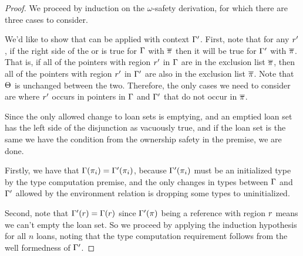 \begin{proof}
  We proceed by induction on the $\omega$-safety derivation, for which there are
  three cases to consider.

  \vspace{1em}
  \noindent \framebox[\textwidth]{ \figuresize
    \begin{mathpar}
      \OSafePlace
    \end{mathpar}
  } \vspace{1em}

  We'd like to show that  can be applied with context
  $\Gamma^\prime$. First, note that for any $r^\prime$, if the right
  side of the or is true for $\Gamma$ with $\overline{\pi}$ then it will
  be true for $\Gamma^\prime$ with $\overline{\pi}$. That is, if all of
  the pointers with region $r^\prime$ in $\Gamma$ are in the exclusion
  list $\overline{\pi}$, then all of the pointers with region
  $r^\prime$ in $\Gamma^\prime$ are also in the exclusion list
  $\overline{\pi}$. Note that $\Theta$ is unchanged between the two.
  Therefore, the only cases we need to consider are where $r^\prime$
  occurs in pointers in $\Gamma$ and $\Gamma^\prime$ that do not occur in
  $\overline{\pi}$.

  Since the only allowed change to loan sets is emptying, and an emptied loan
  set has the left side of the disjunction as vacuously true, and if the loan
  set is the same we have the condition from the ownership safety in the
  premise, we are done.

  \vspace{1em}
  \noindent \framebox[\textwidth]{ \figuresize
    \begin{mathpar}
      \ODeref
    \end{mathpar}
  } \vspace{1em}

  Firstly, we have that $\Gamma(\pi_i) = \Gamma^\prime(\pi_i)$,
  because $\Gamma^\prime(\pi_i)$ must be an initialized type by the type
  computation premise, and the only changes in types between $\Gamma$ and
  $\Gamma^\prime$ allowed by the environment relation is dropping some types
  to uninitialized.

  Second, note that $\Gamma^\prime(r) = \Gamma(r)$ since
  $\Gamma^\prime(\pi)$ being a reference with region $r$ means we
  can't empty the loan set. So we proceed by applying the induction hypothesis
  for all $n$ loans, noting that the type computation requirement follows from
  the well formedness of $\Gamma^\prime$.


\end{proof}
